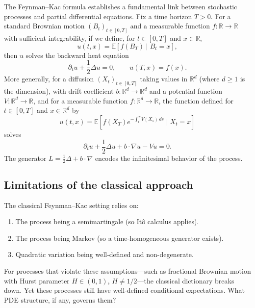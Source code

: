 \documentclass[12pt]{article}
\theoremstyle{plain}
\theoremstyle{definition}
\theoremstyle{remark}
\newcommand{\E}{\mathbb{E}}
\newcommand{\R}{\mathbb{R}}
\begin{document}
The Feynman--Kac formula establishes a fundamental link between stochastic processes and partial differential equations. Fix a time horizon $T > 0$. For a standard Brownian motion $(B_t)_{t \in [0,T]}$ and a measurable function $f: \R \to \R$ with sufficient integrability, if we define, for $t \in [0,T]$ and $x \in \R$,
\begin{equation}\label{eq:FK-basic}
u(t,x) = \E[f(B_T) \mid B_t = x],
\end{equation}
then $u$ solves the backward heat equation
\begin{equation}\label{eq:heat-backward}
\partial_t u + \frac{1}{2}\Delta u = 0, \qquad u(T,x) = f(x).
\end{equation}
More generally, for a diffusion $(X_t)_{t \in [0,T]}$ taking values in $\R^d$ (where $d \geq 1$ is the dimension), with drift coefficient $b: \R^d \to \R^d$ and a potential function $V: \R^d \to \R$, and for a measurable function $f: \R^d \to \R$, the function defined for $t \in [0,T]$ and $x \in \R^d$ by
\begin{equation}\label{eq:FK-general}
u(t,x) = \E\left[f(X_T) e^{-\int_t^T V(X_s)\,ds} \;\Big|\; X_t = x\right]
\end{equation}
solves
\begin{equation}\label{eq:FK-PDE}
\partial_t u + \frac{1}{2}\Delta u + b \cdot \nabla u - Vu = 0.
\end{equation}
The generator $L = \frac{1}{2}\Delta + b \cdot \nabla$ encodes the infinitesimal behavior of the process.

\subsection{Limitations of the classical approach}

The classical Feynman--Kac setting relies on:
\begin{enumerate}[label=(\arabic*)]
\item The process being a semimartingale (so It\^{o} calculus applies).
\item The process being Markov (so a time-homogeneous generator exists).
\item Quadratic variation being well-defined and non-degenerate.
\end{enumerate}
For processes that violate these assumptions---such as fractional Brownian motion with Hurst parameter $H \in (0,1)$, $H \neq 1/2$---the classical dictionary breaks down. Yet these processes still have well-defined conditional expectations. What PDE structure, if any, governs them?
\end{document}
